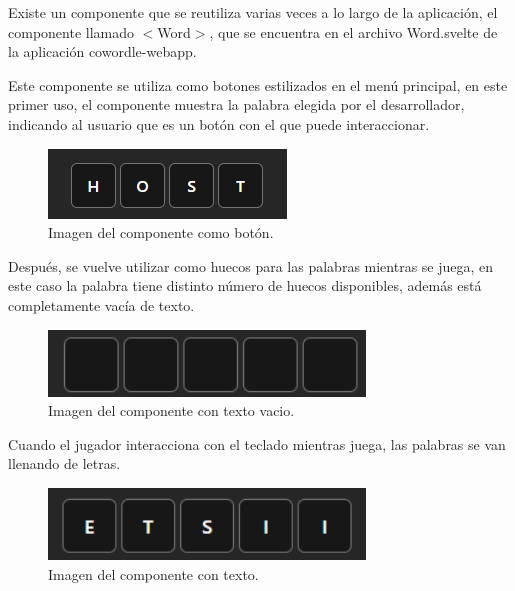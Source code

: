 Existe un componente que se reutiliza varias veces a lo largo de la aplicación, el componente llamado $<$Word$>$, que se encuentra en el archivo Word.svelte de la aplicación cowordle-webapp.

Este componente se utiliza como botones estilizados en el menú principal, en este primer uso, el componente muestra la palabra elegida por el desarrollador, indicando al usuario que es un botón con el que puede interaccionar.

\begin{figure}[H]
	\centering
	\includegraphics[clip=true]{images/reusing/host_component.png}
	\caption{Imagen del componente como botón.}
	\label{fig:comp_host_image}
\end{figure}

Después, se vuelve utilizar como huecos para las palabras mientras se juega, en este caso la palabra tiene distinto número de huecos disponibles, además está completamente vacía de texto.

\begin{figure}[H]
	\centering
	\includegraphics[clip=true, width=0.75\textwidth]{images/reusing/empty_component.png}
	\caption{Imagen del componente con texto vacio.}
	\label{fig:comp_empty}
\end{figure}


Cuando el jugador interacciona con el teclado mientras juega, las palabras se van llenando de letras.

\begin{figure}[H]
	\centering
	\includegraphics[clip=true, width=0.75\textwidth]{images/reusing/filled_component.png}
	\caption{Imagen del componente con texto.}
	\label{fig:comp_filled}
\end{figure}

